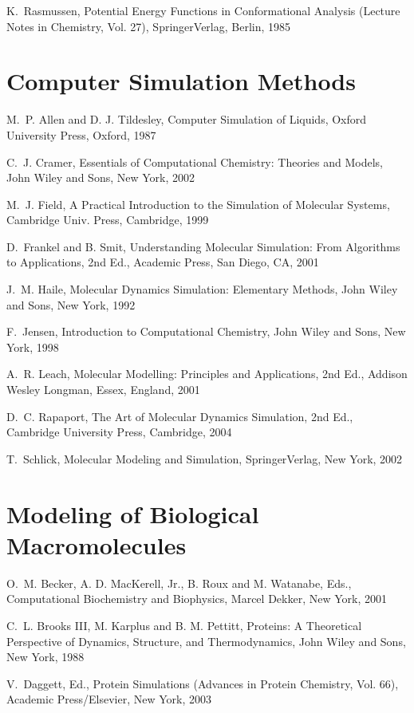 \documentclass[letterpaper,11pt,english]{sphinxmanual}
\begin{document}
K. Rasmussen, Potential Energy Functions in Conformational Analysis (Lecture Notes in Chemistry, Vol. 27), Springer\sphinxhyphen{}Verlag, Berlin, 1985


\section{Computer Simulation Methods}
\label{\detokenize{text/references:computer-simulation-methods}}
M. P. Allen and D. J. Tildesley, Computer Simulation of Liquids, Oxford University Press, Oxford, 1987

C. J. Cramer, Essentials of Computational Chemistry: Theories and Models, John Wiley and Sons, New York, 2002

M. J. Field, A Practical Introduction to the Simulation of Molecular Systems, Cambridge Univ. Press, Cambridge, 1999

D. Frankel and B. Smit, Understanding Molecular Simulation: From Algorithms to Applications, 2nd Ed., Academic Press, San Diego, CA, 2001

J. M. Haile, Molecular Dynamics Simulation: Elementary Methods, John Wiley and Sons, New York, 1992

F. Jensen, Introduction to Computational Chemistry, John Wiley and Sons, New York, 1998

A. R. Leach, Molecular Modelling: Principles and Applications, 2nd Ed., Addison Wesley Longman, Essex, England, 2001

D. C. Rapaport, The Art of Molecular Dynamics Simulation, 2nd Ed., Cambridge University Press, Cambridge, 2004

T. Schlick, Molecular Modeling and Simulation, Springer\sphinxhyphen{}Verlag, New York, 2002


\section{Modeling of Biological Macromolecules}
\label{\detokenize{text/references:modeling-of-biological-macromolecules}}
O. M. Becker, A. D. MacKerell, Jr., B. Roux and M. Watanabe, Eds., Computational Biochemistry and Biophysics, Marcel Dekker, New York, 2001

C. L. Brooks III, M. Karplus and B. M. Pettitt, Proteins: A Theoretical Perspective of Dynamics, Structure, and Thermodynamics, John Wiley and Sons, New York, 1988

V. Daggett, Ed., Protein Simulations (Advances in Protein Chemistry, Vol. 66), Academic Press/Elsevier, New York, 2003
\end{document}
